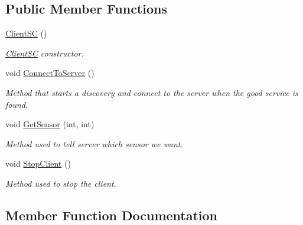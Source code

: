 \subsection*{Public Member Functions}
\begin{DoxyCompactItemize}
\item 
\hyperlink{classClientSC_a1333a55122e64b2ef82b7ac1770a66ba}{Client\+SC} ()\hypertarget{classClientSC_a1333a55122e64b2ef82b7ac1770a66ba}{}\label{classClientSC_a1333a55122e64b2ef82b7ac1770a66ba}

\begin{DoxyCompactList}\small\item\em \hyperlink{classClientSC}{Client\+SC} constructor. \end{DoxyCompactList}\item 
void \hyperlink{classClientSC_ae778a4a0aa9805536bc5fbac6d450916}{Connect\+To\+Server} ()\hypertarget{classClientSC_ae778a4a0aa9805536bc5fbac6d450916}{}\label{classClientSC_ae778a4a0aa9805536bc5fbac6d450916}

\begin{DoxyCompactList}\small\item\em Method that starts a discovery and connect to the server when the good service is found. \end{DoxyCompactList}\item 
void \hyperlink{classClientSC_a867af609c1950ada2a6ce6f808b80e81}{Get\+Sensor} (int, int)\hypertarget{classClientSC_a867af609c1950ada2a6ce6f808b80e81}{}\label{classClientSC_a867af609c1950ada2a6ce6f808b80e81}

\begin{DoxyCompactList}\small\item\em Method used to tell server which sensor we want. \end{DoxyCompactList}\item 
void \hyperlink{classClientSC_a66b5a7e9b4de881bc0f77ac973e9a5b9}{Stop\+Client} ()\hypertarget{classClientSC_a66b5a7e9b4de881bc0f77ac973e9a5b9}{}\label{classClientSC_a66b5a7e9b4de881bc0f77ac973e9a5b9}

\begin{DoxyCompactList}\small\item\em Method used to stop the client. \end{DoxyCompactList}\end{DoxyCompactItemize}


\subsection{Member Function Documentation}
